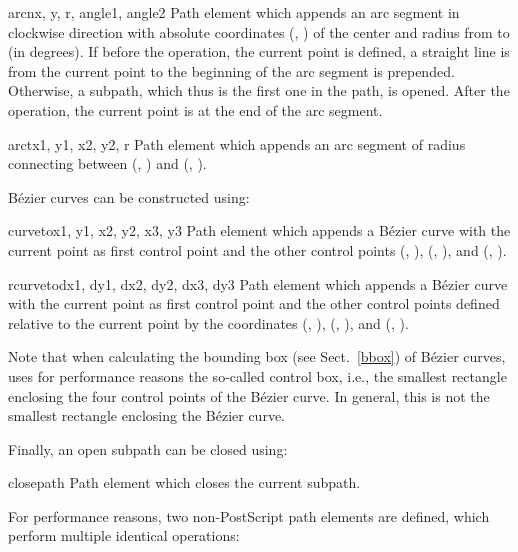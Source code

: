 \begin{classdesc}{arcn}{x, y, r, angle1, angle2}
Path element which appends an arc segment in clockwise direction
with absolute coordinates (, ) of the center and 
radius  from  to  (in degrees).
If before the operation, the current point is defined, a straight line
is from the current point to the beginning of the arc segment is
prepended. Otherwise, a subpath, which thus is the first one in the
path, is opened. After the operation, the current point is at the end
of the arc segment.
\end{classdesc}

\begin{classdesc}{arct}{x1, y1, x2, y2, r}
Path element which appends an arc segment of radius 
connecting between (, ) and (, ).\\
\end{classdesc}

B\'ezier curves can be constructed using: \

\begin{classdesc}{curveto}{x1, y1, x2, y2, x3, y3}
Path element which appends a B\'ezier curve with
the current point as first control point and the other control points
(, ), (, ), and (, ).
\end{classdesc}

\begin{classdesc}{rcurveto}{dx1, dy1, dx2, dy2, dx3, dy3}
Path element which appends a B\'ezier curve with
the current point as first control point and the other control points
defined relative to the current point by the coordinates
(, ), (, ), and (, ).
\end{classdesc}

Note that when calculating the bounding box (see Sect.~\ref{bbox}) of
B\'ezier curves, \PyX{} uses for performance reasons the so-called
control box, i.e., the smallest rectangle enclosing the four control
points of the B\'ezier curve. In general, this is not the smallest
rectangle enclosing the B\'ezier curve.

Finally, an open subpath can be closed using:

\begin{classdesc}{closepath}{}
Path element which closes the current subpath.
\end{classdesc}

For performance reasons, two non-PostScript path elements are defined, 
which perform multiple identical operations:


